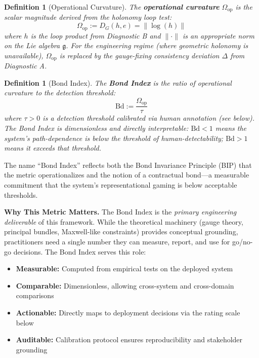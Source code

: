 \documentclass[12pt]{article}
\newtheorem{definition}[theorem]{Definition}
\begin{document}
\begin{definition}[Operational Curvature]
\emph{The \textbf{operational curvature} $\Omega_{\text{op}}$ is the scalar magnitude
derived from the holonomy loop test:}
\[
\Omega_{\text{op}} := D_G(h, e) = \|\log(h)\|
\]
\emph{where $h$ is the loop product from Diagnostic B and $\|\cdot\|$ is an appropriate norm on the Lie algebra
$\mathfrak{g}$. For the engineering regime (where geometric holonomy is unavailable), $\Omega_{\text{op}}$ is replaced by the
gauge-fixing consistency deviation $\Delta$ from Diagnostic A.}
\end{definition}

\begin{definition}[Bond Index]
\emph{The \textbf{Bond Index} is the ratio of operational curvature to the detection
threshold:}
\[
\mathrm{Bd} := \frac{\Omega_{\text{op}}}{\tau}
\]
\emph{where $\tau > 0$ is a detection threshold calibrated via human annotation (see below). The Bond Index
is dimensionless and directly interpretable: $\mathrm{Bd} < 1$ means the system's path-dependence is below
the threshold of human-detectability; $\mathrm{Bd} > 1$ means it exceeds that threshold.}
\end{definition}

The name ``Bond Index'' reflects both the Bond Invariance Principle (BIP) that the metric
operationalizes and the notion of a contractual bond---a measurable commitment that the system's
representational gaming is below acceptable thresholds.

\textbf{Why This Metric Matters.} The Bond Index is the \emph{primary engineering deliverable} of
this framework. While the theoretical machinery (gauge theory, principal bundles, Maxwell-like
constraints) provides conceptual grounding, practitioners need a single number they can measure,
report, and use for go/no-go decisions. The Bond Index serves this role:

\begin{itemize}
\item \textbf{Measurable:} Computed from empirical tests on the deployed system
\item \textbf{Comparable:} Dimensionless, allowing cross-system and cross-domain comparisons
\item \textbf{Actionable:} Directly maps to deployment decisions via the rating scale below
\item \textbf{Auditable:} Calibration protocol ensures reproducibility and stakeholder grounding
\end{itemize}
\end{document}
